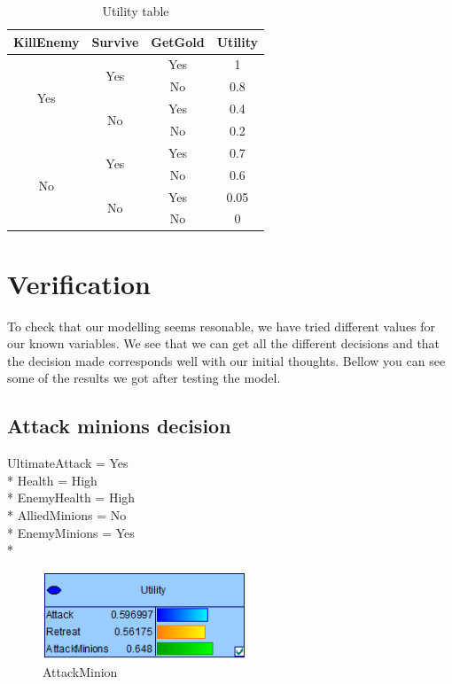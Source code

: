 \documentclass[titlepage]{article}
\begin{document}
\begin{table}[H]
\centering
\begin{tabular}{ |c|c|c|c| }

\hline
KillEnemy & Survive & GetGold & Utility \\ \hline
\multirow{4}{*}{Yes} & \multirow{2}{*}{Yes} & Yes & 1 \\ \cline{3-4}
 & & No & 0.8 \\ \cline{2-4}
 & \multirow{2}{*}{No} & Yes & 0.4 \\ \cline{3-4}
 & & No & 0.2 \\ \hline

 \multirow{4}{*}{No} & \multirow{2}{*}{Yes} & Yes & 0.7 \\ \cline{3-4}
 & & No & 0.6 \\ \cline{2-4}
 & \multirow{2}{*}{No} & Yes & 0.05 \\ \cline{3-4}
 & & No & 0 \\ \hline
\end{tabular}
\caption{Utility table}
\end{table}


\section{Verification}
To check that our modelling seems resonable, we have tried different values for our known variables. We see that we can get all the different decisions and that the decision made corresponds well with our initial thoughts. Bellow you can see some of the results we got after testing the model.

\subsection*{Attack minions decision}
UltimateAttack = Yes \\*
Health = High \\*
EnemyHealth = High \\*
AlliedMinions = No \\*
EnemyMinions = Yes \\*

\begin{figure}[H] \centering
\includegraphics[width=230px]{atkMin.PNG}
\caption{AttackMinion}
\label{fig:atkMin}
\end{figure}
\end{document}
